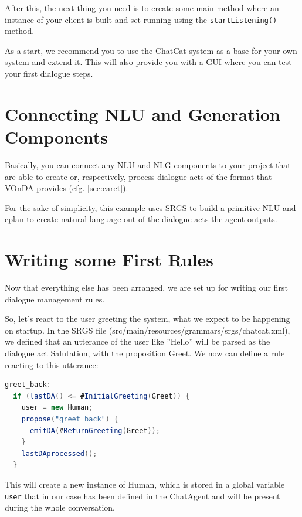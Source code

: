 \documentclass[a4paper]{report}
\newcommand{\vonda}{VOnDA\xspace}
\begin{document}
After this, the next thing you need is to create some main method where an instance of your client is built and set running using the \texttt{startListening()} method.

As a start, we recommend you to use the ChatCat system as a base for your own system and extend it. This will also provide you with a GUI where you can test your first dialogue steps.

\section{Connecting NLU and Generation Components}

Basically, you can connect any NLU and NLG components to your project that are able to create or, respectively, process dialogue acts of the format that \vonda provides (cfg. \ref{sec:caret}).

For the sake of simplicity, this example uses SRGS to build a primitive NLU and cplan to create natural language out of the dialogue acts the agent outputs.

\section{Writing some First Rules}

Now that everything else has been arranged, we are set up for writing our first dialogue management rules.

So, let's react to the user greeting the system, what we expect to be happening on startup. In the SRGS file (src/main/resources/grammars/srgs/chatcat.xml), we defined that an utterance of the user like ''Hello'' will be parsed as the dialogue act Salutation, with the proposition Greet. We now can define a rule reacting to this utterance:

\begin{lstlisting}[language=Java]
greet_back:
  if (lastDA() <= #InitialGreeting(Greet)) {
  	user = new Human;
    propose("greet_back") {
      emitDA(#ReturnGreeting(Greet));
    }
    lastDAprocessed();
  }
\end{lstlisting}

This will create a new instance of Human, which is stored in a global variable \verb|user| that in our case has been defined in the ChatAgent and will be present during the whole conversation.
\end{document}
